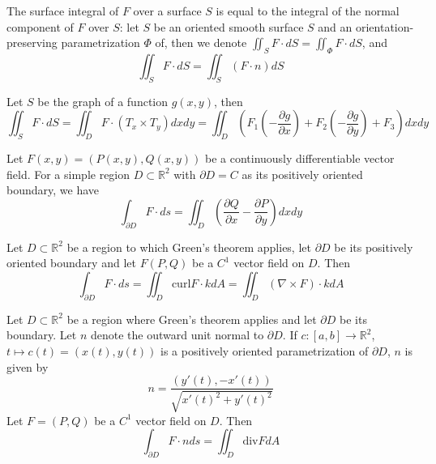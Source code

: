 \documentclass[openany]{book}
\newcommand{\curl}{\text{curl}}
\newcommand{\R}{\mathbb{R}}
\begin{document}
\begin{prop}
    The surface integral of $F$ over a surface $S$ is equal to the integral of the normal component of $F$ over $S$: let $S$ be an oriented smooth surface $S$ and an orientation-preserving parametrization $\Phi$ of, then we denote $\iint_SF\cdot dS=\iint_\Phi F\cdot dS$, and
    \begin{equation*}
        \iint_SF\cdot dS=\iint_S\left(F\cdot n\right)dS
    \end{equation*}
\end{prop}


\begin{prop}
    Let $S$ be the graph of a function $g(x,y)$, then 
    \begin{equation*}
        \iint_SF\cdot dS=\iint_DF\cdot (T_x\times T_y)dxdy=\iint_D\left(F_1\left(-\frac{\partial g}{\partial x}\right)+F_2\left(-\frac{\partial g}{\partial y}\right)+F_3\right)dxdy
    \end{equation*}
\end{prop}

\begin{thm}
    Let $F(x,y)=(P(x,y), Q(x,y))$ be a continuously differentiable vector field. For a simple region $D\subset\R^2$ with $\partial D=C$ as its positively oriented boundary, we have 
    \begin{equation*}
        \int_{\partial D}F\cdot ds=\iint_D\left(\frac{\partial Q}{\partial x}-\frac{\partial P}{\partial y}\right)dxdy
    \end{equation*}
\end{thm}


\begin{thm}
    Let $D\subset\R^2$ be a region to which Green's theorem applies, let $\partial D$ be its positively oriented boundary and let $F(P,Q)$ be a $C^1$ vector field on $D$. Then 
    \begin{equation*}
        \int_{\partial D}F\cdot ds=\iint_D\curl F\cdot k dA=\iint_D(\nabla\times F)\cdot kdA
    \end{equation*}
\end{thm}

\begin{prop}
    Let $D\subset\R^2$ be a region where Green's theorem applies and let $\partial D$ be its boundary. Let $n$ denote the outward unit normal to $\partial D$. If $c:[a,b]\to\R^2$, $t\mapsto c(t)=(x(t), y(t))$ is a positively oriented parametrization of $\partial D$, $n$ is given by 
    \begin{equation*}
        n=\frac{(y'(t), -x'(t))}{\sqrt{x'(t)^2+y'(t)^2}}
    \end{equation*}
    Let $F=(P,Q)$ be a $C^1$ vector field on $D$. Then 
    \begin{equation*}
        \int_{\partial D}F\cdot nds=\iint_D\text{div} FdA
    \end{equation*}
\end{prop}
\end{document}
